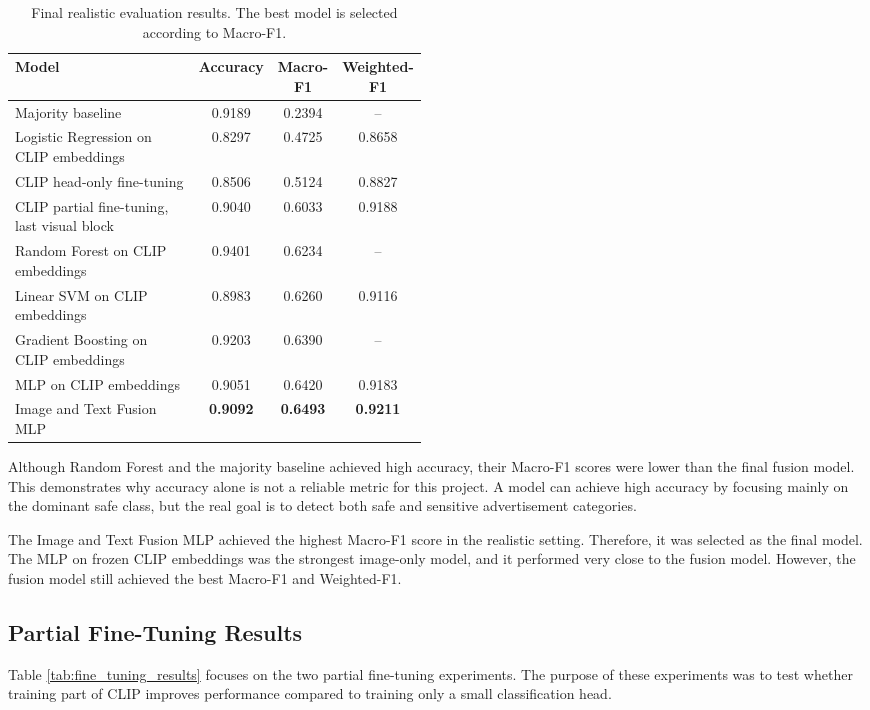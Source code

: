 \documentclass[12pt]{article}
\begin{document}
\begin{table}[H]
\centering
\begin{tabular}{p{0.48\linewidth}ccc}
\toprule
\textbf{Model} & \textbf{Accuracy} & \textbf{Macro-F1} & \textbf{Weighted-F1} \\
\midrule
Majority baseline & 0.9189 & 0.2394 & -- \\
Logistic Regression on CLIP embeddings & 0.8297 & 0.4725 & 0.8658 \\
CLIP head-only fine-tuning & 0.8506 & 0.5124 & 0.8827 \\
CLIP partial fine-tuning, last visual block & 0.9040 & 0.6033 & 0.9188 \\
Random Forest on CLIP embeddings & 0.9401 & 0.6234 & -- \\
Linear SVM on CLIP embeddings & 0.8983 & 0.6260 & 0.9116 \\
Gradient Boosting on CLIP embeddings & 0.9203 & 0.6390 & -- \\
MLP on CLIP embeddings & 0.9051 & 0.6420 & 0.9183 \\
Image and Text Fusion MLP & \textbf{0.9092} & \textbf{0.6493} & \textbf{0.9211} \\
\bottomrule
\end{tabular}
\caption{Final realistic evaluation results. The best model is selected according to Macro-F1.}
\label{tab:realistic_results}
\end{table}

Although Random Forest and the majority baseline achieved high accuracy, their Macro-F1 scores were lower than the final fusion model. This demonstrates why accuracy alone is not a reliable metric for this project. A model can achieve high accuracy by focusing mainly on the dominant safe class, but the real goal is to detect both safe and sensitive advertisement categories.

The Image and Text Fusion MLP achieved the highest Macro-F1 score in the realistic setting. Therefore, it was selected as the final model. The MLP on frozen CLIP embeddings was the strongest image-only model, and it performed very close to the fusion model. However, the fusion model still achieved the best Macro-F1 and Weighted-F1.

\subsection{Partial Fine-Tuning Results}

Table \ref{tab:fine_tuning_results} focuses on the two partial fine-tuning experiments. The purpose of these experiments was to test whether training part of CLIP improves performance compared to training only a small classification head.
\end{document}

